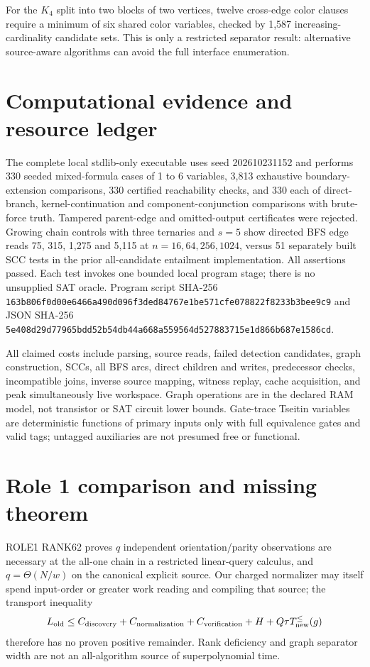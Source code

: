\documentclass[11pt]{article}
\begin{document}
For the $K_4$ split into two blocks of two vertices, twelve cross-edge color clauses require a minimum of six shared color variables, checked by 1,587 increasing-cardinality candidate sets. This is only a restricted separator result: alternative source-aware algorithms can avoid the full interface enumeration.

\section{Computational evidence and resource ledger}
The complete local stdlib-only executable uses seed 202610231152 and performs 330 seeded mixed-formula cases of 1 to 6 variables, 3,813 exhaustive boundary-extension comparisons, 330 certified reachability checks, and 330 each of direct-branch, kernel-continuation and component-conjunction comparisons with brute-force truth. Tampered parent-edge and omitted-output certificates were rejected. Growing chain controls with three ternaries and $s=5$ show directed BFS edge reads 75, 315, 1,275 and 5,115 at $n=16,64,256,1024$, versus 51 separately built SCC tests in the prior all-candidate entailment implementation. All assertions passed. Each test invokes one bounded local program stage; there is no unsupplied SAT oracle. Program script SHA-256 \texttt{163b806f0d00e6466a490d096f3ded84767e1be571cfe078822f8233b3bee9c9} and JSON SHA-256 \texttt{5e408d29d77965bdd52b54db44a668a559564d527883715e1d866b687e1586cd}.

All claimed costs include parsing, source reads, failed detection candidates, graph construction, SCCs, all BFS arcs, direct children and writes, predecessor checks, incompatible joins, inverse source mapping, witness replay, cache acquisition, and peak simultaneously live workspace. Graph operations are in the declared RAM model, not transistor or SAT circuit lower bounds. Gate-trace Tseitin variables are deterministic functions of primary inputs only with full equivalence gates and valid tags; untagged auxiliaries are not presumed free or functional.

\section{Role 1 comparison and missing theorem}
ROLE1 RANK62 proves $q$ independent orientation/parity observations are necessary at the all-one chain in a restricted linear-query calculus, and $q=\Theta(N/w)$ on the canonical explicit source. Our charged normalizer may itself spend input-order or greater work reading and compiling that source; the transport inequality
\[
L_{\rm old}\le C_{\rm discovery}+C_{\rm normalization}+C_{\rm verification}+H+Q\tau T_{\rm new}^{\le}(g)
\]
therefore has no proven positive remainder. Rank deficiency and graph separator width are not an all-algorithm source of superpolynomial time.
\end{document}
